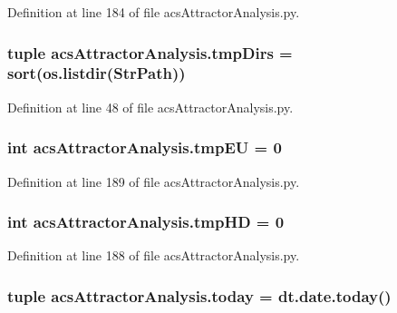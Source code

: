 Definition at line 184 of file acs\-Attractor\-Analysis.\-py.

\hypertarget{a00096_ac88c3245a42ebefee3fcf90626f6eaf4}{
\subsubsection[{tmp\-Dirs}]{\setlength{\rightskip}{0pt plus 5cm}tuple acs\-Attractor\-Analysis.\-tmp\-Dirs = sort(os.\-listdir({\bf Str\-Path}))}}\label{a00096_ac88c3245a42ebefee3fcf90626f6eaf4}


Definition at line 48 of file acs\-Attractor\-Analysis.\-py.

\hypertarget{a00096_a0c4860774229747cda9dabe70614abc6}{
\subsubsection[{tmp\-E\-U}]{\setlength{\rightskip}{0pt plus 5cm}int acs\-Attractor\-Analysis.\-tmp\-E\-U = 0}}\label{a00096_a0c4860774229747cda9dabe70614abc6}


Definition at line 189 of file acs\-Attractor\-Analysis.\-py.

\hypertarget{a00096_a1fe1582f1d1dc5f55558d25c8eb30ad7}{
\subsubsection[{tmp\-H\-D}]{\setlength{\rightskip}{0pt plus 5cm}int acs\-Attractor\-Analysis.\-tmp\-H\-D = 0}}\label{a00096_a1fe1582f1d1dc5f55558d25c8eb30ad7}


Definition at line 188 of file acs\-Attractor\-Analysis.\-py.

\hypertarget{a00096_a71bc5e3d205016fb7893b438e75be78e}{
\subsubsection[{today}]{\setlength{\rightskip}{0pt plus 5cm}tuple acs\-Attractor\-Analysis.\-today = dt.\-date.\-today()}}\label{a00096_a71bc5e3d205016fb7893b438e75be78e}


